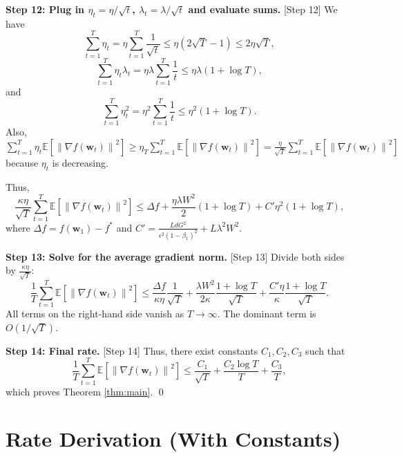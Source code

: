 \documentclass{article}
\theoremstyle{plain}
\theoremstyle{definition}
\renewcommand{\vec}[1]{\boldsymbol{#1}}
\newcommand{\norm}[1]{\left\| #1 \right\|}
\newcommand{\expect}[1]{\mathbb{E}\left[ #1 \right]}
\begin{document}
\textbf{Step 12: Plug in $\eta_t = \eta / \sqrt{t}$, $\lambda_t = \lambda / \sqrt{t}$ and evaluate sums.} [Step 12]
We have
\begin{equation}
    \sum_{t=1}^T \eta_t = \eta \sum_{t=1}^T \frac{1}{\sqrt{t}} \le \eta (2\sqrt{T} - 1) \le 2 \eta \sqrt{T},
\end{equation}
\begin{equation}
    \sum_{t=1}^T \eta_t \lambda_t = \eta \lambda \sum_{t=1}^T \frac{1}{t} \le \eta \lambda (1 + \log T),
\end{equation}
and
\begin{equation}
    \sum_{t=1}^T \eta_t^2 = \eta^2 \sum_{t=1}^T \frac{1}{t} \le \eta^2 (1 + \log T).
\end{equation}
Also, $\sum_{t=1}^T \eta_t \expect{\norm{\nabla f(\vec{w}_t)}^2} \ge \eta_T \sum_{t=1}^T \expect{\norm{\nabla f(\vec{w}_t)}^2} = \frac{\eta}{\sqrt{T}} \sum_{t=1}^T \expect{\norm{\nabla f(\vec{w}_t)}^2}$ because $\eta_t$ is decreasing.

Thus,
\begin{equation}
    \frac{\kappa \eta}{\sqrt{T}} \sum_{t=1}^T \expect{\norm{\nabla f(\vec{w}_t)}^2} \le \Delta f + \frac{\eta \lambda W^2}{2} (1 + \log T) + C' \eta^2 (1 + \log T),
\end{equation}
where $\Delta f = f(\vec{w}_1) - f^*$ and $C' = \frac{L d G^2}{\epsilon^2 (1-\beta_1)^2} + L \lambda^2 W^2$.

\textbf{Step 13: Solve for the average gradient norm.} [Step 13]
Divide both sides by $\frac{\kappa \eta}{\sqrt{T}}$:
\begin{equation}
    \frac{1}{T} \sum_{t=1}^T \expect{\norm{\nabla f(\vec{w}_t)}^2} \le \frac{\Delta f}{\kappa \eta} \frac{1}{\sqrt{T}} + \frac{\lambda W^2}{2\kappa} \frac{1 + \log T}{\sqrt{T}} + \frac{C' \eta}{\kappa} \frac{1 + \log T}{\sqrt{T}}.
\end{equation}
All terms on the right-hand side vanish as $T \to \infty$. The dominant term is $O(1/\sqrt{T})$.

\textbf{Step 14: Final rate.} [Step 14]
Thus, there exist constants $C_1, C_2, C_3$ such that
\begin{equation}
    \frac{1}{T} \sum_{t=1}^T \expect{\norm{\nabla f(\vec{w}_t)}^2} \le \frac{C_1}{\sqrt{T}} + \frac{C_2 \log T}{T} + \frac{C_3}{T},
\end{equation}
which proves Theorem \ref{thm:main}. \qed

\section*{Rate Derivation (With Constants)}
\end{document}
